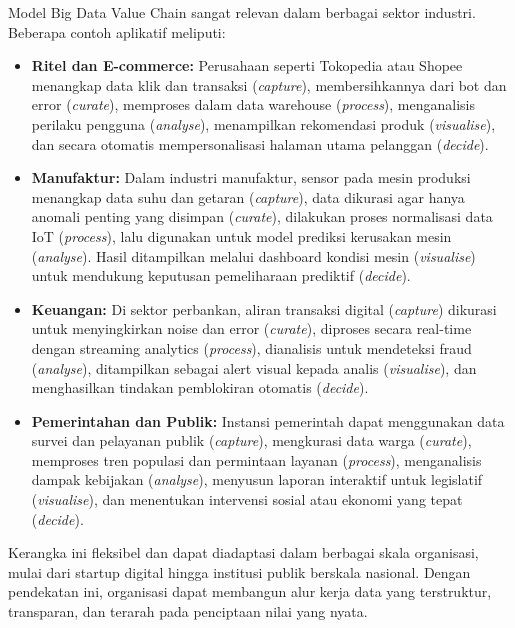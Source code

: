Model Big Data Value Chain sangat relevan dalam berbagai sektor industri. Beberapa contoh aplikatif meliputi:

\begin{itemize}
	\item \textbf{Ritel dan E-commerce:} Perusahaan seperti Tokopedia atau Shopee menangkap data klik dan transaksi (\textit{capture}), membersihkannya dari bot dan error (\textit{curate}), memproses dalam data warehouse (\textit{process}), menganalisis perilaku pengguna (\textit{analyse}), menampilkan rekomendasi produk (\textit{visualise}), dan secara otomatis mempersonalisasi halaman utama pelanggan (\textit{decide}).
	
	\item \textbf{Manufaktur:} Dalam industri manufaktur, sensor pada mesin produksi menangkap data suhu dan getaran (\textit{capture}), data dikurasi agar hanya anomali penting yang disimpan (\textit{curate}), dilakukan proses normalisasi data IoT (\textit{process}), lalu digunakan untuk model prediksi kerusakan mesin (\textit{analyse}). Hasil ditampilkan melalui dashboard kondisi mesin (\textit{visualise}) untuk mendukung keputusan pemeliharaan prediktif (\textit{decide}).
	
	\item \textbf{Keuangan:} Di sektor perbankan, aliran transaksi digital (\textit{capture}) dikurasi untuk menyingkirkan noise dan error (\textit{curate}), diproses secara real-time dengan streaming analytics (\textit{process}), dianalisis untuk mendeteksi fraud (\textit{analyse}), ditampilkan sebagai alert visual kepada analis (\textit{visualise}), dan menghasilkan tindakan pemblokiran otomatis (\textit{decide}).
	
	\item \textbf{Pemerintahan dan Publik:} Instansi pemerintah dapat menggunakan data survei dan pelayanan publik (\textit{capture}), mengkurasi data warga (\textit{curate}), memproses tren populasi dan permintaan layanan (\textit{process}), menganalisis dampak kebijakan (\textit{analyse}), menyusun laporan interaktif untuk legislatif (\textit{visualise}), dan menentukan intervensi sosial atau ekonomi yang tepat (\textit{decide}).
\end{itemize}

Kerangka ini fleksibel dan dapat diadaptasi dalam berbagai skala organisasi, mulai dari startup digital hingga institusi publik berskala nasional. Dengan pendekatan ini, organisasi dapat membangun alur kerja data yang terstruktur, transparan, dan terarah pada penciptaan nilai yang nyata.



